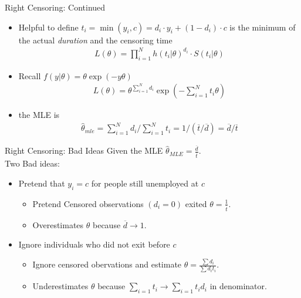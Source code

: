 \documentclass[aspectratio=169]{beamer}
\begin{document}
\begin{frame}{Right Censoring: Continued}
\begin{itemize}
\item Helpful to define $t_i = \min(y_i,c) = d_i\cdot y_i + (1-d_i)\cdot c$ is the minimum of the actual \textit{duration} and the \alert{censoring time}
\begin{align*}
L( \theta ) = \prod _ { i = 1 } ^ { N } h \left( t _ { i } | \theta \right) ^ { d _ { i } } \cdot S \left( t _ { i } | \theta \right)
\end{align*}
\item Recall $f(y | \theta) = \theta \exp(-y \theta)$
\begin{align*}
L ( \theta ) = \theta^{\sum_{i=1}^N d_i} \exp \left(- \sum_{i=1}^N t_i \theta \right)
\end{align*}
\item the MLE is 
\begin{align*}
\hat { \theta } _ { m l e } = \sum _ { i = 1 } ^ { N } d _ { i } / \sum _ { i = 1 } ^ { N } t _ { i } = 1 / ( \overline { t } / \overline { d } ) = \overline { d } / \overline { t }\end{align*}
\end{itemize}
\end{frame}


\begin{frame}{Right Censoring: Bad Ideas}
Given the MLE $\widehat{\theta}_{MLE} = \frac{\overline{d}}{\overline{t}}$.\\

Two Bad ideas:
\begin{itemize}
\item Pretend that $y_i=c$ for people still unemployed at $c$
\begin{itemize}
    \item Pretend Censored observations $(d_i=0)$ exited $\theta = \frac{1}{\overline{t}}$. 
    \item Overestimates $\theta$ because $\overline{d} \rightarrow 1$.
\end{itemize}
\item Ignore individuals who did not exit before $c$
\begin{itemize}
    \item Ignore censored obervations and estimate $\theta = \frac{\sum d_i }{\sum d_i t_i}$. 
    \item Underestimates $\theta$ because $\sum_{i=1} t_i \rightarrow \sum_{i=1} t_i d_i$ in denominator.
\end{itemize}
\end{itemize}
\end{frame}
\end{document}
